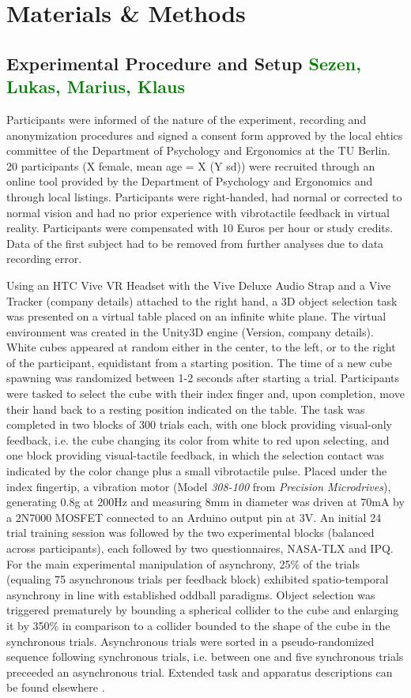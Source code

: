 \section{Materials \& Methods}
\subsection{Experimental Procedure and Setup \textcolor{green}{Sezen, Lukas, Marius, Klaus}}
Participants were informed of the nature of the experiment, recording and anonymization procedures and signed a consent form approved by the local ehtics committee of the Department of Psychology and Ergonomics at the TU Berlin. 20 participants (X female, mean age = X (Y sd)) were recruited through an online tool provided by the Department of Psychology and Ergonomics and through local listings. Participants were right-handed, had normal or corrected to normal vision and had no prior experience with vibrotactile feedback in virtual reality. Participants were compensated with 10 Euros per hour or study credits. Data of the first subject had to be removed from further analyses due to data recording error.

Using an HTC Vive VR Headset with the Vive Deluxe Audio Strap and a Vive Tracker (company details) attached to the right hand, a 3D object selection task was presented on a virtual table placed on an infinite white plane. The virtual environment was created in the Unity3D engine (Version, company details). White cubes appeared at random either in the center, to the left, or to the right of the participant, equidistant from a starting position. The time of a new cube spawning was randomized between 1-2 seconds after starting a trial. Participants were tasked to select the cube with their index finger and, upon completion, move their hand back to a resting position indicated on the table. The task was completed in two blocks of 300 trials each, with one block providing visual-only feedback, i.e. the cube changing its color from white to red upon selecting, and one block providing visual-tactile feedback, in which the selection contact was indicated by the color change plus a small vibrotactile pulse. Placed under the index fingertip, a vibration motor (Model \textit{308-100} from \textit{Precision Microdrives}), generating 0.8g at 200Hz and measuring 8mm in diameter was driven at 70mA by a 2N7000 MOSFET connected to an Arduino output pin at 3V. An initial 24 trial training session was followed by the two experimental blocks (balanced across participants), each followed by two questionnaires, NASA-TLX and IPQ. For the main experimental manipulation of asynchrony, 25\% of the trials (equaling 75 asynchronous trials per feedback block) exhibited spatio-temporal asynchrony in line with established oddball paradigms. Object selection was triggered prematurely by bounding a spherical collider to the cube and enlarging it by 350\% in comparison to a collider bounded to the shape of the cube in the synchronous trials. Asynchronous trials were sorted in a pseudo-randomized sequence following synchronous trials, i.e. between one and five synchronous trials preceeded an asynchronous trial. Extended task and apparatus descriptions can be found elsewhere \cite{Gehrke_2019}.

